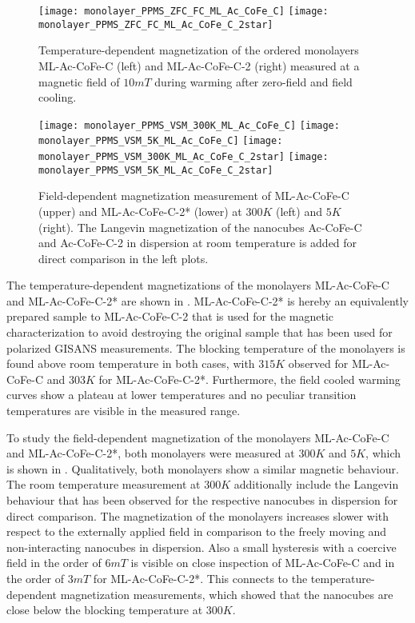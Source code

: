 \documentclass[\main/dresen_thesis.tex]{subfiles}
\begin{document}
  \begin{figure}[tb]
    \centering
    \texttt{[image: monolayer\_PPMS\_ZFC\_FC\_ML\_Ac\_CoFe\_C]}
    \texttt{[image: monolayer\_PPMS\_ZFC\_FC\_ML\_Ac\_CoFe\_C\_2star]}
    \caption{\label{fig:monolayer:magneticStructure:ppmsZFCFC}Temperature-dependent magnetization of the ordered monolayers ML-Ac-CoFe-C (left) and ML-Ac-CoFe-C-2 (right) measured at a magnetic field of $10 \unit{mT}$ during warming after zero-field and field cooling.}
  \end{figure}

  \begin{figure}[!htbp]
    \centering
    \texttt{[image: monolayer\_PPMS\_VSM\_300K\_ML\_Ac\_CoFe\_C]}
    \texttt{[image: monolayer\_PPMS\_VSM\_5K\_ML\_Ac\_CoFe\_C]}
    \texttt{[image: monolayer\_PPMS\_VSM\_300K\_ML\_Ac\_CoFe\_C\_2star]}
    \texttt{[image: monolayer\_PPMS\_VSM\_5K\_ML\_Ac\_CoFe\_C\_2star]}
    \caption{\label{fig:monolayer:magneticStructure:MLAcCoFeC12}Field-dependent magnetization measurement of ML-Ac-CoFe-C (upper) and ML-Ac-CoFe-C-2* (lower) at $300 \unit{K}$ (left) and $5 \unit{K}$ (right). The Langevin magnetization of the nanocubes Ac-CoFe-C and Ac-CoFe-C-2 in dispersion at room temperature is added for direct comparison in the left plots.}
  \end{figure}

  The temperature-dependent magnetizations of the monolayers ML-Ac-CoFe-C and ML-Ac-CoFe-C-2* are shown in .
  ML-Ac-CoFe-C-2* is hereby an equivalently prepared sample to ML-Ac-CoFe-C-2 that is used for the magnetic characterization to avoid destroying the original sample that has been used for polarized GISANS measurements.
  The blocking temperature of the monolayers is found above room temperature in both cases, with $315 \unit{K}$ observed for ML-Ac-CoFe-C and $303 \unit{K}$ for ML-Ac-CoFe-C-2*.
  Furthermore, the field cooled warming curves show a plateau at lower temperatures and no peculiar transition temperatures are visible in the measured range.

  To study the field-dependent magnetization of the monolayers ML-Ac-CoFe-C and ML-Ac-CoFe-C-2*, both monolayers were measured at $300 \unit{K}$ and $5 \unit{K}$, which is shown in . Qualitatively, both monolayers show a similar magnetic behaviour.
  The room temperature measurement at $300 \unit{K}$ additionally include the Langevin behaviour that has been observed for the respective nanocubes in dispersion for direct comparison.
  The magnetization of the monolayers increases slower with respect to the externally applied field in comparison to the freely moving and non-interacting nanocubes in dispersion.
  Also a small hysteresis with a coercive field in the order of $6 \unit{mT}$ is visible on close inspection of ML-Ac-CoFe-C and in the order of $3 \unit{mT}$ for ML-Ac-CoFe-C-2*.
  This connects to the temperature-dependent magnetization measurements, which showed that the nanocubes are close below the blocking temperature at $300 \unit{K}$.
\end{document}
